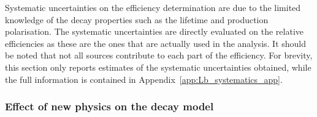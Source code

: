 %
Systematic uncertainties on the efficiency determination are due to the limited knowledge
of the decay properties such as the \Lb lifetime and production polarisation.
The systematic uncertainties are directly evaluated on the relative efficiencies as these are the ones that
are actually used in the analysis. It should be noted that not all sources contribute to each part
of the efficiency. For brevity, this section only reports estimates of the systematic
uncertainties obtained, while the full information is contained in Appendix~\ref{app:Lb_systematics_app}.
%

\subsubsection{Effect of new physics on the decay model}
\label{sec:WCvariation}


